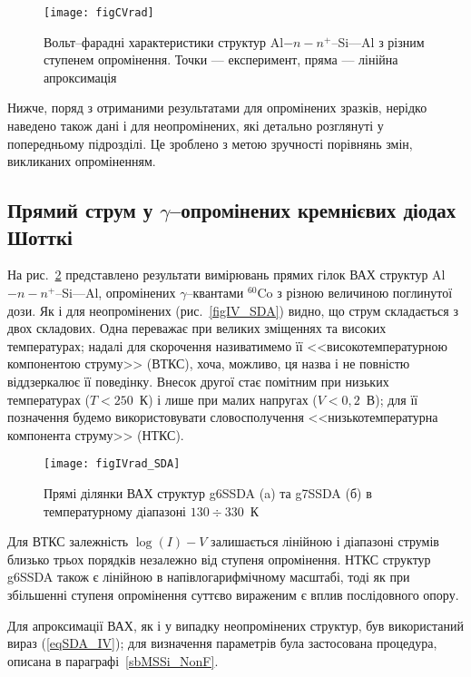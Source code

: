 \begin{figure}
\center
\texttt{[image: figCVrad]}
\caption{\label{figCVrad}
Вольт--фарадні характеристики структур Al$-n-n^+$--Si---Al з різним ступенем опромінення.
Точки --- експеримент, пряма --- лінійна апроксимація
}%
\end{figure}


Нижче, поряд з отриманими результатами для опромінених зразків, нерідко наведено також дані і для неопромінених,
які детально розглянуті у попередньому підрозділі.
Це зроблено з метою зручності порівнянь змін, викликаних опроміненням.


\subsection{Прямий струм у $\gamma$--опромінених кремнієвих діодах Шотткі}

На рис.~\ref{figIVrad_SDA} представлено результати вимірювань прямих гілок ВАХ структур Al$-n-n^+$--Si---Al, опромінених
$\gamma$--квантами $^{60}$Co з різною величиною поглинутої дози.
Як і для неопромінених (рис.~\ref{figIV_SDA}) видно, що струм складається з двох складових.
Одна переважає при великих зміщеннях та високих температурах; надалі для скорочення називатимемо її
<<високотемпературною компонентою струму>> (ВТКС), хоча, можливо, ця назва і не повністю віддзеркалює її поведінку.
Внесок другої стає помітним при низьких температурах ($T<250$~К) і лише при малих напругах ($V<0,2$~В);
для її позначення будемо використовувати словосполучення <<низькотемпературна компонента струму>> (НТКС).


\begin{figure}
\center
\texttt{[image: figIVrad\_SDA]}
\caption{\label{figIVrad_SDA}
Прямі  ділянки ВАХ структур g6SSDA (a)  та g7SSDA (б) в температурному діапазоні $130\div330$~К
}%
\end{figure}

Для ВТКС залежність $\log(I)-V$ залишається лінійною і діапазоні струмів близько трьох порядків незалежно від ступеня опромінення.
НТКС структур g6SSDA також є лінійною в напівлогарифмічному масштабі, тоді як при
збільшенні ступеня опромінення суттєво вираженим є вплив послідовного опору.

Для апроксимації ВАХ, як і у випадку неопромінених структур, був використаний вираз (\ref{eqSDA_IV});
для визначення параметрів була застосована процедура, описана в параграфі~\ref{sbMSSi_NonF}.

